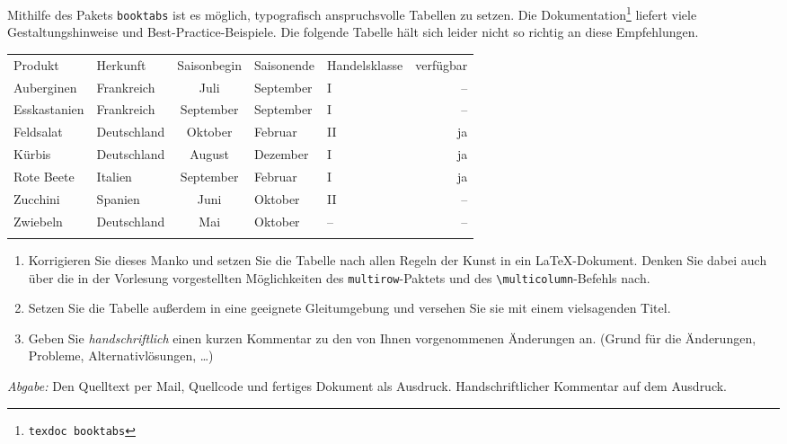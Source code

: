 \documentclass{scrartcl}
\newcommand{\abgabe}[1]{\par\noindent\textit{Abgabe:} #1}
\begin{document}
\begin{question}[subtitle=Schöne Tabelle]{6}
	Mithilfe des Pakets \verb|booktabs| ist es möglich, typografisch anspruchsvolle Tabellen zu setzen. Die Dokumentation\footnote{\texttt{texdoc booktabs}} liefert viele Gestaltungshinweise und Best-Practice-Beispiele. Die folgende Tabelle hält sich leider nicht so richtig an diese Empfehlungen.

\begin{minipage}{\textwidth}
	\centering
	\begin{tabular}{|p{2.1cm}||p{2.5cm}|cl|lr|}
		\hhline{=-----}
		Produkt & Herkunft & Saisonbegin & Saisonende & Handelsklasse & verfügbar\\\hhline{======}
		Auberginen & Frankreich & Juli & September & I & – \\\hline
		Esskastanien & Frankreich & September & September & I & – \\\hline
		Feldsalat & Deutschland & Oktober & Februar & II & ja \\\hline
		Kürbis & Deutschland & August & Dezember & I & ja\\\hline
		Rote Beete & Italien & September & Februar & I  & ja\\\hline
		Zucchini & Spanien & Juni & Oktober & II &  –\\\hline
		Zwiebeln & Deutschland & Mai & Oktober & – & –\\\hhline{======}
	\end{tabular}
\end{minipage}
	
	\begin{enumerate}[label=\alph*)]
		\item Korrigieren Sie dieses Manko und setzen Sie die Tabelle nach allen Regeln der Kunst in ein \LaTeX-Dokument. Denken Sie dabei auch über die in der Vorlesung vorgestellten Möglichkeiten des \verb|multirow|-Paktets und des \texttt{\textbackslash multicolumn}-Befehls nach.
		\item Setzen Sie die Tabelle außerdem in eine geeignete Gleitumgebung und versehen Sie sie mit einem vielsagenden Titel.
		\item Geben Sie \emph{handschriftlich} einen kurzen Kommentar zu den von Ihnen vorgenommenen Änderungen an. (Grund für die Änderungen, Probleme, Alternativlösungen, …)
	\end{enumerate}
	\abgabe{Den Quelltext per Mail, Quellcode und fertiges Dokument als Ausdruck. Handschriftlicher Kommentar auf dem Ausdruck.}
\end{question}
\end{document}
